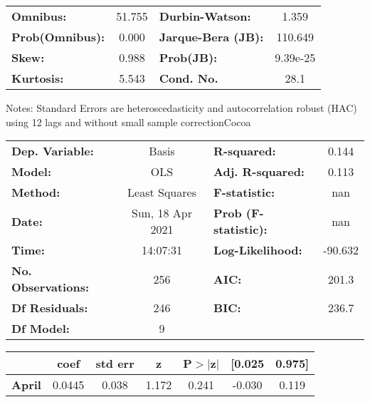 \begin{center}
\begin{tabular}{lcccccc}
\bottomrule
\end{tabular}
\begin{tabular}{lclc}
\textbf{Omnibus:}       & 51.755 & \textbf{  Durbin-Watson:     } &    1.359  \\
\textbf{Prob(Omnibus):} &  0.000 & \textbf{  Jarque-Bera (JB):  } &  110.649  \\
\textbf{Skew:}          &  0.988 & \textbf{  Prob(JB):          } & 9.39e-25  \\
\textbf{Kurtosis:}      &  5.543 & \textbf{  Cond. No.          } &     28.1  \\
\bottomrule
\end{tabular}
\end{center}

Notes: \newline
 [1] Standard Errors are heteroscedasticity and autocorrelation robust (HAC) using 12 lags and without small sample correctionCocoa\begin{center}
\begin{tabular}{lclc}
\toprule
\textbf{Dep. Variable:}    &      Basis       & \textbf{  R-squared:         } &     0.144   \\
\textbf{Model:}            &       OLS        & \textbf{  Adj. R-squared:    } &     0.113   \\
\textbf{Method:}           &  Least Squares   & \textbf{  F-statistic:       } &       nan   \\
\textbf{Date:}             & Sun, 18 Apr 2021 & \textbf{  Prob (F-statistic):} &      nan    \\
\textbf{Time:}             &     14:07:31     & \textbf{  Log-Likelihood:    } &   -90.632   \\
\textbf{No. Observations:} &         256      & \textbf{  AIC:               } &     201.3   \\
\textbf{Df Residuals:}     &         246      & \textbf{  BIC:               } &     236.7   \\
\textbf{Df Model:}         &           9      & \textbf{                     } &             \\
\bottomrule
\end{tabular}
\begin{tabular}{lcccccc}
                   & \textbf{coef} & \textbf{std err} & \textbf{z} & \textbf{P$> |$z$|$} & \textbf{[0.025} & \textbf{0.975]}  \\
\midrule
\textbf{April}     &       0.0445  &        0.038     &     1.172  &         0.241        &       -0.030    &        0.119     \\

\end{tabular}
\end{center}
